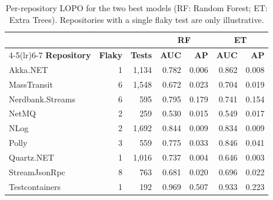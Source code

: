 \begin{table}[!h]
\caption{Per-repository LOPO for the two best models (RF: Random Forest; ET: Extra Trees). Repositories with a single flaky test are only illustrative.}
\label{tab:lopo-repo}
\centering
\scriptsize
\setlength{\tabcolsep}{4pt}
\begin{tabular}{@{}lrrrrrr@{}}
\toprule
 & & & \multicolumn{2}{c}{\textbf{RF}} & \multicolumn{2}{c}{\textbf{ET}} \\
\cmidrule(lr){4-5}\cmidrule(lr){6-7}
\textbf{Repository} & \textbf{Flaky} & \textbf{Tests} & \textbf{AUC} & \textbf{AP} & \textbf{AUC} & \textbf{AP} \\
\midrule
Akka.NET         & 1 & 1,134 & 0.782 & 0.006 & 0.862 & 0.008 \\
MassTransit      & 6 & 1,548 & 0.672 & 0.023 & 0.704 & 0.019 \\
Nerdbank.Streams & 6 &   595 & 0.795 & 0.179 & 0.741 & 0.154 \\
NetMQ            & 2 &   259 & 0.530 & 0.015 & 0.549 & 0.017 \\
NLog             & 2 & 1,692 & 0.844 & 0.009 & 0.834 & 0.009 \\
Polly            & 3 &   559 & 0.775 & 0.033 & 0.846 & 0.041 \\
Quartz.NET       & 1 & 1,016 & 0.737 & 0.004 & 0.646 & 0.003 \\
StreamJsonRpc    & 8 &   763 & 0.681 & 0.020 & 0.696 & 0.022 \\
Testcontainers   & 1 &   192 & 0.969 & 0.507 & 0.933 & 0.223 \\
\bottomrule
\end{tabular}
\end{table}

